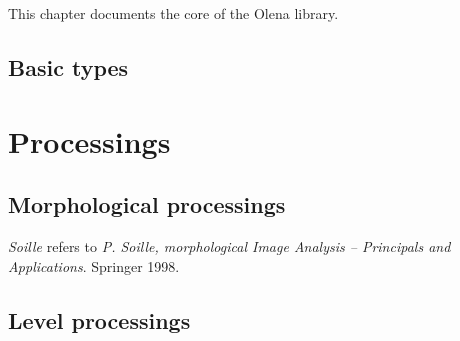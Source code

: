 \documentclass{book}
\begin{document}
This chapter documents the core of the Olena library.

\section{Basic types}



\chapter{Processings}

\section{Morphological processings}

\emph{Soille} refers to \emph{P. Soille, morphological Image Analysis
-- Principals and Applications}.  Springer 1998.



\section{Level processings}


\end{document}
